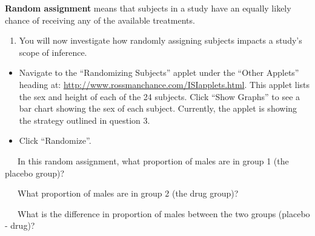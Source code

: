 \documentclass[
]{report}
\providecommand{\tightlist}{%
  \setlength{\itemsep}{0pt}\setlength{\parskip}{0pt}}
\begin{document}
\textbf{Random assignment} means that subjects in a study have an equally likely chance of receiving any of the available treatments.

\newpage

\begin{enumerate}
\def\labelenumi{\arabic{enumi}.}
\setcounter{enumi}{5}
\tightlist
\item
  You will now investigate how randomly assigning subjects impacts a study's scope of inference.
\end{enumerate}

\begin{itemize}
\item
  Navigate to the ``Randomizing Subjects'' applet under the ``Other Applets'' heading at: \url{http://www.rossmanchance.com/ISIapplets.html}. This applet lists the sex and height of each of the 24 subjects. Click ``Show Graphs'' to see a bar chart showing the sex of each subject. Currently, the applet is showing the strategy outlined in question 3.
\item
  Click ``Randomize''.
\end{itemize}

~~~In this random assignment, what proportion of males are in group 1 (the placebo group)?

\vspace{0.1in}

~~~What proportion of males are in group 2 (the drug group)?

\vspace{0.1in}

~~~What is the difference in proportion of males between the two groups (placebo - drug)?

\vspace{0.1in}
\end{document}
